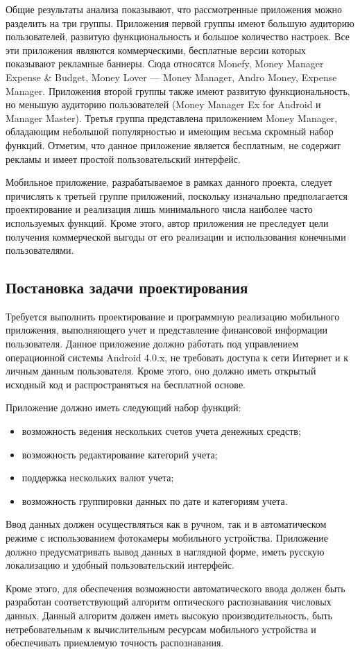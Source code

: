Общие результаты анализа показывают, что рассмотренные приложения
можно разделить на три группы.
Приложения первой группы имеют большую аудиторию пользователей,
развитую функциональность и большое количество настроек.
Все эти приложения являются коммерческими,
бесплатные версии которых показывают рекламные баннеры.
Сюда относятся Monefy, Money Manager Expense \& Budget,
Money Lover --- Money Manager, Andro Money, Expense Manager.
Приложения второй группы также имеют развитую функциональность,
но меньшую аудиторию пользователей
(Money Manager Ex for Android и Manager Master).
Третья группа представлена приложением Money Manager,
обладающим небольшой популярностью и имеющим весьма скромный набор функций.
Отметим, что данное приложение является бесплатным,
не содержит рекламы и имеет простой пользовательский интерфейс.

Мобильное приложение, разрабатываемое в рамках данного проекта,
следует причислять к третьей группе приложений,
поскольку изначально предполагается проектирование и реализация лишь
минимального числа наиболее часто используемых функций.
Кроме этого, автор приложения не преследует цели получения
коммерческой выгоды от его реализации и использования конечными пользователями.

\subsection{Постановка задачи проектирования}
\label{subsec:spec_task}

Требуется выполнить проектирование и
программную реализацию мобильного приложения, выполняющего учет и представление
финансовой информации пользователя.
Данное приложение должно работать под управлением операционной системы Android 4.0.x,
не требовать доступа к сети Интернет и к личным данным пользователя.
Кроме этого, оно должно иметь открытый исходный код
и распространяться на бесплатной основе.

Приложение должно иметь следующий набор функций:
\begin{itemize}
  \item возможность ведения нескольких счетов учета денежных средств;
  \item возможность редактирование категорий учета;
  \item поддержка нескольких валют учета;
  \item возможность группировки данных по дате и категориям учета.
\end{itemize}

Ввод данных должен осуществляться как в ручном,
так и в автоматическом режиме с использованием фотокамеры мобильного устройства.
Приложение должно предусматривать вывод данных в наглядной форме,
иметь русскую локализацию и удобный пользовательский интерфейс.

Кроме этого, для обеспечения возможности автоматического ввода должен быть
разработан соответствующий алгоритм оптического распознавания числовых данных.
Данный алгоритм должен иметь высокую производительность,
быть нетребовательным к вычислительным ресурсам мобильного устройства
и обеспечивать приемлемую точность распознавания.